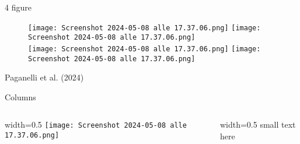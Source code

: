 \documentclass{beamer} %
\begin{document}
\begin{frame}{4 figure}
\begin{figure} %
    \centering %
    \texttt{[image: Screenshot 2024-05-08 alle 17.37.06.png]} 
    \texttt{[image: Screenshot 2024-05-08 alle 17.37.06.png]} \\ %
    \texttt{[image: Screenshot 2024-05-08 alle 17.37.06.png]} 
    \texttt{[image: Screenshot 2024-05-08 alle 17.37.06.png]} \\ %
\end{figure}

\bigskip %
\centering %
\scriptsize{Paganelli et al. (2024)} %
\end{frame}

\begin{frame}{Columns} %

    \begin{columns}
    \begin{column}{width=0.5\textwidth}
        \texttt{[image: Screenshot 2024-05-08 alle 17.37.06.png]}       
    \end{column}
    \begin{column}{width=0.5\textwidth}
        small text here
    \end{column}
    \end{columns}
\end{frame}
\end{document}
